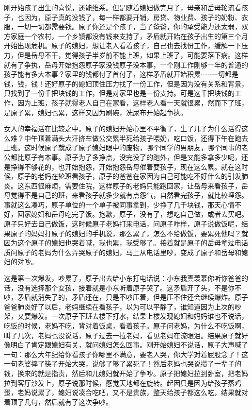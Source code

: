 刚开始孩子出生的喜悦，还能维系。但是随着媳妇做完月子，母亲和岳母轮流看孩子，也因为，原子真的没钱了，每一样都要开销，房贷、物业费、孩子的奶粉、衣服，一切一切都需要钱。原子你还是个孩子，当了爸爸，你的承受能力还太弱，双方家庭一个农村，一个乡镇都没有钱来支持了，矛盾就开始在孩子出生的第三个月开始出现危机。原子的媳妇，想让老人看着孩子，自己也去找份工作，缓解一下压力，但是岳母不干，觉得孩子半岁前不能上班，如果上班了，可能要落下病。这样就有了争执，岳母开始抱怨原子家没钱原子没本事，一个刚工作刚够一年的普通的孩子能有多大本事？家里的钱都付了首付了，这样矛盾就开始积累$\cdots\cdots$一切都是钱，钱，钱！还好原子的媳妇顶住压力找了一份工作，但是因为没有关系和背景，只找到了一份千把块钱的工作，但是对家里也是一份支持。可是这千把块钱的工作，因为上班，孩子就得老人自己在家看，这样老人看一天就很累，然而下了班，是原子累，媳妇也累，这样又因为刷碗，洗尿布开始起争执。

女人的幸福活在比较之中。原子的媳妇开始心里不平衡了，生了儿子为什么活得这么难？中午顶着满头大汗挤车做公交累半死给孩子喂奶，吃口饭，还得下午在跑去上班。这时候原子就成了原子媳妇眼中的废物，哪个同学的男朋友，哪个同事的老公都比原子有本事。原子为了多挣点，没完没了的跑外，但是又能多拿多少呢，还是挣得不够花的，也开始抱怨，开始抱怨岳母催着要孩子，现在这么累。就在这时候，原子的老妈在轮班看孩子，原子的爸爸在家因为自己可能吃不好什么的引发肺炎。这东西很麻烦，需要住院，这样原子的老妈只能跑回家，让岳母来看孩子，岳母觉得不是自己的班，来看孩子就多少就有点怨气，自然看完孩子，就比较埋怨。事就这么凑巧，原子单位的一个单子被同事拿到，少挣了几千块钱，那天心情不好，回家媳妇和岳母吃完了饭。抱歉，原子，没有了，想吃自己做，或者去买吧。原子只好去自己做饭，这时候原子老妈打来电话，问原子咋样，原子说做饭呢，结果原子的妈妈打原子的媳妇的手机说，那么累了，怎么不给做饭，要累死他吗？就因为这个原子的媳妇也哭着喊，我也累，我受够了。接着就是原子的岳母拿过电话质问原子的老妈为什么弄哭原子的媳妇，马上从电话里吵，变成了原子和岳母和媳妇的对吵。

这是第一次爆发，吵累了，原子出去给小东打电话说：小东我真羡慕你听你爸爸的话，没有选择那个女孩，接着就是小东听着原子哭了。这矛盾开了头，不是你不吵，矛盾就消失了的，矛盾还在，只是不吵压着，但是压不住还会继续爆炸。原子爸爸肺炎好了以后，老妈继续在看孩子，以为可以平静了，谁知道因为上次的吵架，又要爆发。一次原子下班去楼下打水，结果上楼发现媳妇和妈妈谁也不说话，吃饭的时候，老妈不吃，背对着饭桌，看着孩子。原子问老妈，为什么不吃饭啊，叫了几次，老妈也没说话，原子过去一拉老妈，看见老妈在流眼泪。结果原子就好像明白了肯定跟媳妇有关，就问媳妇怎么回事。刚开始媳妇不说话，原子大声喊了一句：那么大年纪给你看孩子你哪里不满意，要老人哭，你大学对着屁股念了！这一句老婆摔了筷子开始大哭，说够了够了累死了！然后老妈也哭说攒了一辈子的钱，换来的就是指责，然后和儿媳妇就开始了争吵。原子把媳妇拉到卧室，把老妈拉到客厅沙发上，原子说那时候，感觉天地都在旋转。起因只是因为给孩子蒸鸡蛋，老妈说累了，媳妇说凑合吃吧，又不是贵族，整天给孩子都这么吃，结果就对着顶了几句，然后就有了这次争吵。

